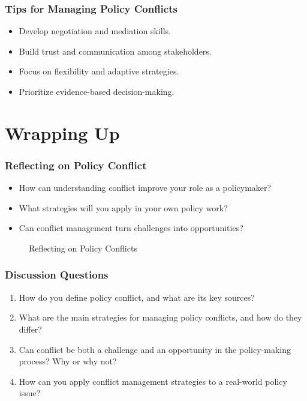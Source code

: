 \documentclass[10pt]{beamer}
\begin{document}
            \begin{frame}
            \frametitle{Tips for Managing Policy Conflicts}
            \begin{itemize}
                \item Develop negotiation and mediation skills.
                \item Build trust and communication among stakeholders.
                \item Focus on flexibility and adaptive strategies.
                \item Prioritize evidence-based decision-making.
            \end{itemize}
            \end{frame}

            \section{Wrapping Up}
            
            \begin{frame}
            \frametitle{Reflecting on Policy Conflict}
            \begin{itemize}
                \item How can understanding conflict improve your role as a policymaker?
                \item What strategies will you apply in your own policy work?
                \item Can conflict management turn challenges into opportunities?
            \end{itemize}
            
            \begin{figure}
                \centering
                \caption{Reflecting on Policy Conflicts}
            \end{figure}
            \end{frame}
            
            \begin{frame}
            \frametitle{Discussion Questions}
            
            \begin{enumerate}
                \item How do you define policy conflict, and what are its key sources?
                \item What are the main strategies for managing policy conflicts, and how do they differ?
                \item Can conflict be both a challenge and an opportunity in the policy-making process? Why or why not?
                \item How can you apply conflict management strategies to a real-world policy issue?
            \end{enumerate}
            \end{frame}
\end{document}
